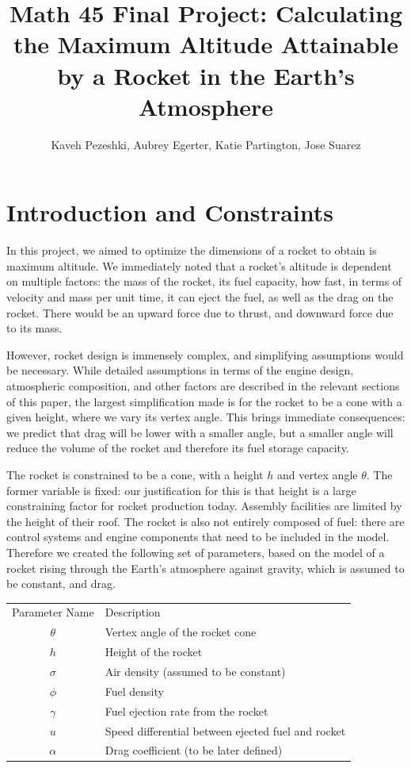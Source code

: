 \documentclass[]{article}
\title{Math 45 Final Project: Calculating the Maximum Altitude Attainable by a Rocket in the Earth's Atmosphere}
\author{Kaveh Pezeshki, Aubrey Egerter, Katie Partington, Jose Suarez}
\begin{document}
\maketitle

\section{Introduction and Constraints}

In this project, we aimed to optimize the dimensions of a rocket to obtain is maximum altitude. We immediately noted that a rocket's altitude is dependent on multiple factors: the mass of the rocket, its fuel capacity, how fast, in terms of velocity and mass per unit time, it can eject the fuel, as well as the drag on the rocket. There would be an upward force due to thrust, and downward force due to its mass.

However, rocket design is immensely complex, and simplifying assumptions would be necessary. While detailed assumptions in terms of the engine design, atmospheric composition, and other factors are described in the relevant sections of this paper, the largest simplification made is for the rocket to be a cone with a given height, where we vary its vertex angle. This brings immediate consequences: we predict that drag will be lower with a smaller angle, but a smaller angle will reduce the volume of the rocket and therefore its fuel storage capacity.

The rocket is constrained to be a cone, with a  height $h$ and vertex angle $\theta$. The former variable is fixed: our justification for this is that height is a large constraining factor for rocket production today. Assembly facilities are limited by the height of their roof. The rocket is also not entirely composed of fuel: there are control systems and engine components that need to be included in the model. Therefore we created the following set of parameters, based on the model of a rocket rising through the Earth's atmosphere against gravity, which is assumed to be constant, and drag.

\begin{center}
	\begin{tabular} {c l}
		Parameter Name & Description \\
		$\theta$ & Vertex angle of the rocket cone \\
		$h$ & Height of the rocket \\
		$\sigma$ & Air density (assumed to be constant) \\
		$\phi$ & Fuel density \\
		$\gamma$ & Fuel ejection rate from the rocket \\
		$u$ & Speed differential between ejected fuel and rocket \\
		$\alpha$ & Drag coefficient (to be later defined)
	\end{tabular}
\end{center}
\end{document}
